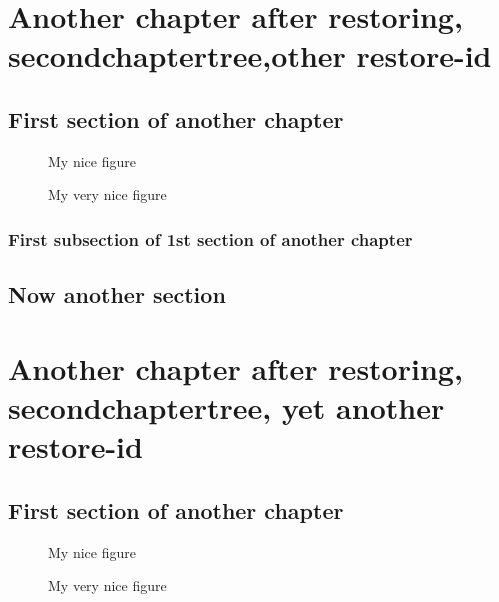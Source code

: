 \documentclass{book}
\begin{document}


\chapter{Another chapter after restoring, secondchaptertree,other restore-id}



\section{First section of another chapter}

\begin{figure}
\caption{My nice figure}
\end{figure}

\begin{figure}
\caption{My very nice figure}
\end{figure}


\subsection{First subsection of 1st section of another chapter}

\section{Now another section}



\chapter{Another chapter after restoring, secondchaptertree, yet another restore-id}



\section{First section of another chapter}

\begin{figure}
\caption{My nice figure}
\end{figure}

\begin{figure}
\caption{My very nice figure}
\end{figure}
\end{document}
